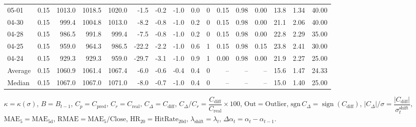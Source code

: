 \begin{threeparttable}
{\begin{tabular}{lrrrrrrrrrrrrrrr}
  05-01 &     0.15 & 1013.0 & 1018.5 & 1020.0 &       -1.5 &           -0.2 &                     -1.0 &                 0.0 &              0 &       0.15 &      0.98 &           0.00 &             13.8 &            1.34 &                  40.00 \\
  04-30 &     0.15 &  999.4 & 1004.8 & 1013.0 &       -8.2 &           -0.8 &                     -1.0 &                 0.2 &              0 &       0.15 &      0.98 &           0.00 &             21.1 &            2.06 &                  40.00 \\
  04-28 &     0.15 &  986.5 &  991.8 &  999.4 &       -7.5 &           -0.8 &                     -1.0 &                 0.2 &              0 &       0.15 &      0.98 &           0.00 &             22.8 &            2.29 &                  35.00 \\
  04-25 &     0.15 &  959.0 &  964.3 &  986.5 &      -22.2 &           -2.2 &                     -1.0 &                 0.6 &              1 &       0.15 &      0.98 &           0.15 &             23.8 &            2.41 &                  30.00 \\
  04-24 &     0.15 &  929.3 &  929.3 &  959.0 &      -29.7 &           -3.1 &                     -1.0 &                 0.9 &              1 &       0.00 &      0.98 &           0.00 &             21.9 &            2.27 &                  25.00 \\
Average &     0.15 & 1060.9 & 1061.4 & 1067.4 &       -6.0 &           -0.6 &                     -0.4 &                 0.4 &              0 &         -- &        -- &             -- &             15.6 &            1.47 &                  24.33 \\
 Median &     0.15 & 1067.0 & 1067.0 & 1071.0 &       -8.0 &           -0.7 &                     -1.0 &                 0.4 &              0 &         -- &        -- &             -- &             15.0 &            1.40 &                  25.00 \\
\bottomrule
\end{tabular}
}
\begin{tablenotes}\footnotesize
\item $\kappa=\kappa(\sigma)$, $B=B_{t-1}$, $C_p=C_{\text{pred}}$, $C_r=C_{\text{real}}$, $C_\Delta=C_{\text{diff}}$, $C_\Delta/C_r=\dfrac{C_{\text{diff}}}{C_{\text{real}}}\times100$, $\mathrm{Out}=\text{Outlier}$, $\mathrm{sgn}\,C_\Delta=\operatorname{sign}(C_{\text{diff}})$, $|C_\Delta|/\sigma=\dfrac{|C_{\text{diff}}|}{\sigma_t^{\text{shift}}}$, $\mathrm{MAE}_5=\mathrm{MAE}_{5\text{d}}$, $\mathrm{RMAE}= \mathrm{MAE}_5 / \text{Close}$, $\mathrm{HR}_{20}=\mathrm{HitRate}_{20\text{d}}$, 
$\lambda_{\text{shift}}=\lambda_t$, 
$\Delta\alpha_t=\alpha_t-\alpha_{t-1}$.
\end{tablenotes}
\end{threeparttable}
\endgroup

